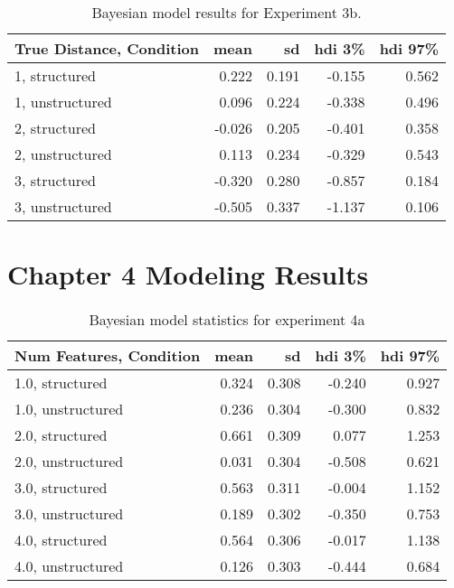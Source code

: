 \begin{table}
\end{table}

\begin{table}
    \centering
    \label{lab:exp3-bayesmodel-stats}
    \caption{Bayesian model results for Experiment 3b.}
    \begin{tabular}{lrrrr}
        \toprule
        True Distance, Condition & mean & sd & hdi 3\% & hdi 97\% \\
        \midrule
        1, structured & 0.222 & 0.191 & -0.155 & 0.562 \\
        1, unstructured & 0.096 & 0.224 & -0.338 & 0.496 \\
        2, structured & -0.026 & 0.205 & -0.401 & 0.358 \\
        2, unstructured & 0.113 & 0.234 & -0.329 & 0.543 \\
        3, structured & -0.320 & 0.280 & -0.857 & 0.184 \\
        3, unstructured & -0.505 & 0.337 & -1.137 & 0.106 \\
        \bottomrule
        \end{tabular}
        
\end{table}

\chapter{Chapter 4 Modeling Results}

\begin{table}
    \centering
    \label{tab:exp4-bayes-model-results}
    \caption{Bayesian model statistics for experiment 4a}
    \begin{tabular}{lrrrr}
        \toprule
        Num Features, Condition & mean & sd & hdi 3\% & hdi 97\% \\
        \midrule
        1.0, structured & 0.324 & 0.308 & -0.240 & 0.927 \\
        1.0, unstructured & 0.236 & 0.304 & -0.300 & 0.832 \\
        2.0, structured & 0.661 & 0.309 & 0.077 & 1.253 \\
        2.0, unstructured & 0.031 & 0.304 & -0.508 & 0.621 \\
        3.0, structured & 0.563 & 0.311 & -0.004 & 1.152 \\
        3.0, unstructured & 0.189 & 0.302 & -0.350 & 0.753 \\
        4.0, structured & 0.564 & 0.306 & -0.017 & 1.138 \\
        4.0, unstructured & 0.126 & 0.303 & -0.444 & 0.684 \\
        \bottomrule
        \end{tabular}
        
\end{table}

